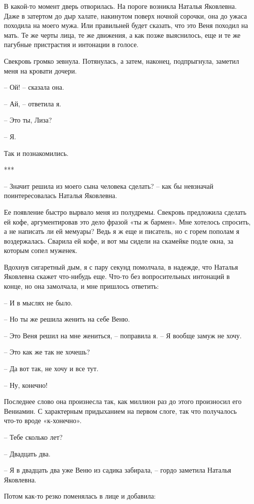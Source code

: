 \documentclass[
]{book}
\begin{document}
В какой-то момент дверь отворилась. На пороге возникла Наталья Яковлевна. Даже в затертом до дыр халате, накинутом поверх ночной сорочки, она до ужаса походила на моего мужа. Или правильней будет сказать, что это Веня походил на мать. Те же черты лица, те же движения, а как позже выяснилось, еще и те же пагубные пристрастия и интонации в голосе.

Свекровь громко зевнула. Потянулась, а затем, наконец, подпрыгнула, заметил меня на кровати дочери.

-- Ой! -- сказала она.

-- Ай, -- ответила я.

-- Это ты, Лиза?

-- Я.

Так и познакомились.

***

-- Значит решила из моего сына человека сделать? -- как бы невзначай поинтересовалась Наталья Яковлевна.

Ее появление быстро вырвало меня из полудремы. Свекровь предложила сделать ей кофе, аргументировав это дело фразой «ты ж бармен». Мне хотелось спросить, а не написать ли ей мемуары? Ведь я ж еще и писатель, но с горем пополам я воздержалась. Сварила ей кофе, и вот мы сидели на скамейке подле окна, за которым сопел муженек.

Вдохнув сигаретный дым, я с пару секунд помолчала, в надежде, что Наталья Яковлевна скажет что-нибудь еще. Что-то без вопросительных интонаций в конце, но она замолчала, и мне пришлось ответить:

-- И в мыслях не было.

-- Но ты же решила женить на себе Веню.

-- Это Веня решил на мне жениться, -- поправила я. -- Я вообще замуж не хочу.

-- Это как же так не хочешь?

-- Да вот так, не хочу и все тут.

-- Ну, конечно!

Последнее слово она произнесла так, как миллион раз до этого произносил его Вениамин. С характерным придыханием на первом слоге, так что получалось что-то вроде «к-хонечно».

-- Тебе сколько лет?

-- Двадцать два.

-- Я в двадцать два уже Веню из садика забирала, -- гордо заметила Наталья Яковлевна.

Потом как-то резко поменялась в лице и добавила:
\end{document}

